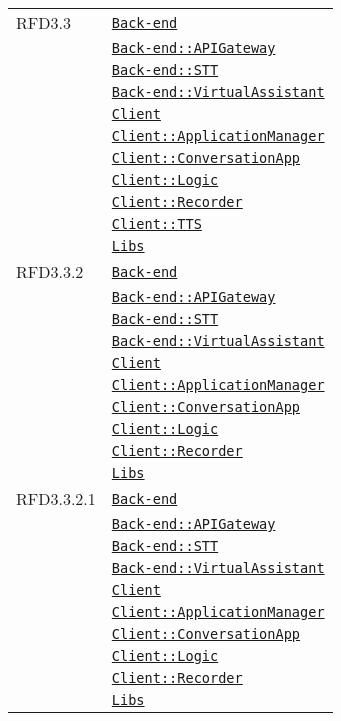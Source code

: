 \begin{longtable}{|>{\centering}m{3cm}|m{10cm}<{\centering}|}
RFD3.3 & \hyperref[Back-end]{\texttt{Back-end}}\\
& \hyperref[Back-end::APIGateway]{\texttt{Back-end::APIGateway}}\\
& \hyperref[Back-end::STT]{\texttt{Back-end::STT}}\\
& \hyperref[Back-end::VirtualAssistant]{\texttt{Back-end::VirtualAssistant}}\\
& \hyperref[Client]{\texttt{Client}}\\
& \hyperref[Client::ApplicationManager]{\texttt{Client::ApplicationManager}}\\
& \hyperref[Client::ConversationApp]{\texttt{Client::ConversationApp}}\\
& \hyperref[Client::Logic]{\texttt{Client::Logic}}\\
& \hyperref[Client::Recorder]{\texttt{Client::Recorder}}\\
& \hyperref[Client::TTS]{\texttt{Client::TTS}}\\
& \hyperref[Libs]{\texttt{Libs}}\\ \hline

RFD3.3.2 & \hyperref[Back-end]{\texttt{Back-end}}\\
& \hyperref[Back-end::APIGateway]{\texttt{Back-end::APIGateway}}\\
& \hyperref[Back-end::STT]{\texttt{Back-end::STT}}\\
& \hyperref[Back-end::VirtualAssistant]{\texttt{Back-end::VirtualAssistant}}\\
& \hyperref[Client]{\texttt{Client}}\\
& \hyperref[Client::ApplicationManager]{\texttt{Client::ApplicationManager}}\\
& \hyperref[Client::ConversationApp]{\texttt{Client::ConversationApp}}\\
& \hyperref[Client::Logic]{\texttt{Client::Logic}}\\
& \hyperref[Client::Recorder]{\texttt{Client::Recorder}}\\
& \hyperref[Libs]{\texttt{Libs}}\\ \hline

RFD3.3.2.1 & \hyperref[Back-end]{\texttt{Back-end}}\\
& \hyperref[Back-end::APIGateway]{\texttt{Back-end::APIGateway}}\\
& \hyperref[Back-end::STT]{\texttt{Back-end::STT}}\\
& \hyperref[Back-end::VirtualAssistant]{\texttt{Back-end::VirtualAssistant}}\\
& \hyperref[Client]{\texttt{Client}}\\
& \hyperref[Client::ApplicationManager]{\texttt{Client::ApplicationManager}}\\
& \hyperref[Client::ConversationApp]{\texttt{Client::ConversationApp}}\\
& \hyperref[Client::Logic]{\texttt{Client::Logic}}\\
& \hyperref[Client::Recorder]{\texttt{Client::Recorder}}\\
& \hyperref[Libs]{\texttt{Libs}}\\ \hline


\end{longtable}

